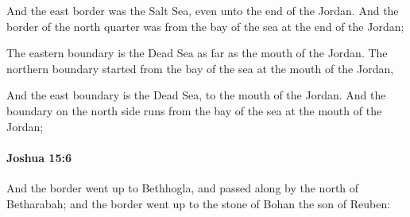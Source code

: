 			\begin{versebox}
					\item[BHS] 
					\item[ASV] And the east border was the Salt Sea, even unto the end of the Jordan. And the border of the north quarter was from the bay of the sea at the end of the Jordan;
					\item[NIV] The eastern boundary is the Dead Sea as far as the mouth of the Jordan. The northern boundary started from the bay of the sea at the mouth of the Jordan,
					\item[NRSV] And the east boundary is the Dead Sea, to the mouth of the Jordan. And the boundary on the north side runs from the bay of the sea at the mouth of the Jordan;
			\end{versebox}

		\paragraph{Joshua 15:6} %
			\label{JOSHUA-15-6}

			And the border went up to Bethhogla, and passed along by the north of Betharabah; and the border went up to the stone of Bohan the son of Reuben:

